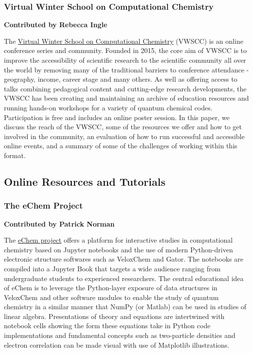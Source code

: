 \documentclass[9pt,review]{livecoms}
\begin{document}
\subsubsection{Virtual Winter School on Computational Chemistry}

\textbf{Contributed by Rebecca Ingle}

The \href{https://winterschool.cc}{Virtual Winter School on Computational Chemistry} (VWSCC) is an online conference series and community. Founded in 2015, the core aim of VWSCC is to improve the accessibility of scientific research to the scientific community all over the world by removing many of the traditional barriers to conference attendance - geography, income, career stage and many others. As well as offering access to talks combining pedagogical content and cutting-edge research developments, the VWSCC has been creating and maintaining an archive of education resources and running hands-on workshops for a variety of quantum chemical codes.  Participation is free and includes an online poster session. In this paper\cite{ROOS2020112975}, we discuss the reach of the VWSCC, some of the resources we offer and how to get involved in the community, an evaluation of how to run successful and accessible online events, and a summary of some of the challenges of working within this format.

\subsection{Online Resources and Tutorials}


\subsubsection{The eChem Project}

\textbf{Contributed by Patrick Norman}

The \href{https://doi.org/10.30746/978-91-988114-0-7}{eChem project} offers a platform for interactive studies in computational chemistry based on Jupyter notebooks and the use of modern Python-driven electronic structure softwares such as VeloxChem  and Gator.  
The notebooks are compiled into a Jupyter Book that targets a wide audience ranging from undergraduate students to experienced researchers.
The central educational idea of eChem is to leverage the Python-layer exposure of data structures in VeloxChem and other software modules to enable the study of quantum chemistry in a similar manner that NumPy (or Matlab) can be used in studies of linear algebra. Presentations of theory and equations are intertwined with notebook cells showing the form these equations take in Python code implementations and fundamental concepts such as two-particle densities and electron correlation can be made visual with use of Matplotlib illustrations. 
\end{document}
